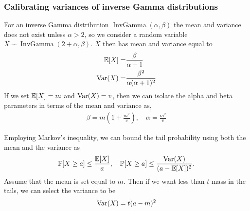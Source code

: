 \documentclass{article}
\begin{document}
\subsubsection{Calibrating variances of inverse Gamma distributions}
\label{sec:invgamvar}
For an inverse Gamma distribution $\operatorname{InvGamma}(\alpha,\beta)$ the mean and variance does not exist unless $\alpha>2$, so we consider a random variable $X\sim\operatorname{InvGamma}(2+\alpha,\beta)$. $X$ then has mean and variance equal to 
\begin{align}
\operatorname{\mathbb{E}}\!{\left[X\right]}=&\frac{\beta}{\alpha+1}\\
\operatorname{\mathrm{Var}}\!{\left(X\right)}=&\frac{\beta^2}{\alpha(\alpha+1)^2}
\end{align}
If we set $\operatorname{\mathbb{E}}\!{\left[X\right]}=m$ and $\operatorname{\mathrm{Var}}\!{\left(X\right)}=v$, then we can isolate the alpha and beta parameters in terms of the mean and variance as,
\begin{align}
\beta=m\left(1+\frac{m^2}{v}\right),\quad 
\alpha=\frac{m^2}{v}
\end{align}



Employing Markov's inequality, we can bound the tail probability using both the mean and the variance as 
\begin{equation}
\mathbb{P}[X\geq a]\leq \frac{\operatorname{\mathbb{E}}\!{\left[X\right]}}{a},\quad \mathbb{P}[X\geq a]\leq \frac{\operatorname{\mathrm{Var}}\!{\left(X\right)}}{(a-\operatorname{\mathbb{E}}\!{\left[X\right]})^2}.
\end{equation}
Assume that the mean is set equal to $m$. Then if we want less than $t$ mass in the tails, we can select the variance to be
\begin{equation}
\operatorname{\mathrm{Var}}\!{\left(X\right)}=t(a-m)^2
\end{equation}

\end{document}
